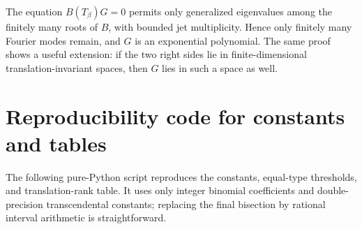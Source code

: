 \documentclass[11pt,oneside]{article}
\theoremstyle{definition}
\theoremstyle{remark}
\begin{document}
The equation $B(T_\beta)G=0$ permits only generalized eigenvalues among the finitely many
roots of $B$, with bounded jet multiplicity.  Hence only finitely many Fourier modes remain,
and $G$ is an exponential polynomial.  The same proof shows a useful extension: if the two
right sides lie in finite-dimensional translation-invariant spaces, then $G$ lies in such a
space as well.

\section{Reproducibility code for constants and tables}
\label{app:code}

The following pure-Python script reproduces the constants, equal-type thresholds, and
translation-rank table.  It uses only integer binomial coefficients and double-precision
transcendental constants; replacing the final bisection by rational interval arithmetic is
straightforward.
\end{document}
